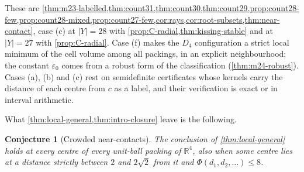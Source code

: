 \documentclass[11pt,reqno]{amsart}
\renewcommand{\_}{\origunderscore\allowbreak}
\numberwithin{equation}{section}
\theoremstyle{plain}
\newtheorem{conjecture}[thm]{Conjecture}
\theoremstyle{definition}
\theoremstyle{remark}
\begin{document}
These are \cref{thm:m23-labelled,thm:count31,thm:count30,thm:count29,prop:count28-few,prop:count28-mixed,prop:count27-few,cor:rays,cor:root-subsets,thm:near-contact}, case (c) at $|Y|=28$ with \cref{prop:C-radial,thm:kissing-stable} and at $|Y|=27$ with \cref{prop:C-radial}.
Case (f) makes the $D_4$ configuration a strict local minimum of the cell
volume among all packings, in an explicit neighbourhood; the constant
$\varepsilon_0$ comes from a robust form of the classification
(\cref{thm:m24-robust}). Cases (a), (b) and (c) rest on semidefinite
certificates whose kernels carry the distance of each centre from $c$ as a
label, and their verification is exact or in interval arithmetic.

What \cref{thm:local-general,thm:intro-closure} leave is the following.

\begin{conjecture}[Crowded near-contacts]\label{conj:shell}
The conclusion of \cref{thm:local-general} holds at every centre of every
unit-ball packing of $\mathbb{R}^4$, also when some centre lies at a
distance strictly between $2$ and $2\sqrt2$ from it and
$\Phi(d_1,d_2,\dots)\le8$.
\end{conjecture}
\end{document}

